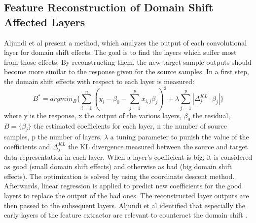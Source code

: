 \subsection{Feature Reconstruction of Domain Shift Affected Layers}
Aljundi et al \cite{Aljundi2016} present a method, which analyzes the output of each convolutional layer for domain shift effects. The goal is to find the layers which suffer most from those effects. By reconstructing them, the new target sample outputs should become more similar to the response given for the source samples. In a first step, the domain shift effects with respect to each layer is measured:
\begin{equation}
    B^{*} = argmin_{B} \{ \sum_{i=1}^{n}( y_{i}-\beta_{0}-\sum_{j=1}^{p}x_{i,j}\beta_{j})^{2} + \lambda \sum_{j=1}^{p}|\Delta_{j}^{KL}\cdot \beta_{j}| \}
\end{equation}
where y is the response, x the output of the various layers, $\beta_{0}$ the residual, $B = \{\beta_{j}\}$ the estimated coefficients for each layer, n the number of
source samples, p the number of layers, $\lambda$ a tuning parameter to punish the value of the coefficients and $\Delta_{j}^{KL}$ the KL divergence measured between the source and target data representation in each layer. When a layer's coefficient is big, it is considered as good (small domain shift effects) and otherwise as bad (big domain shift effects). The optimization is solved by using the coordinate descent method. Afterwards, linear regression is applied to predict new coefficients for the good layers to replace the output of the bad ones. The reconstructed layer outputs are then passed to the subsequent layers. Aljundi et al identified that especially the early layers of the feature extractor are relevant to counteract the domain shift \cite{Aljundi2016}.